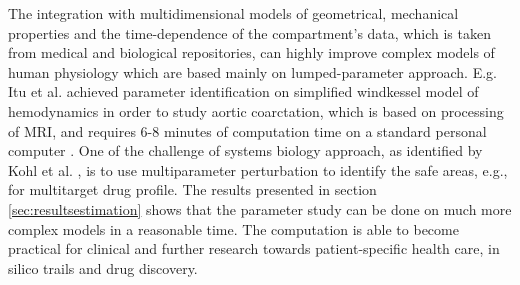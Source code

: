 \begin{itemize}
The integration with multidimensional models of geometrical, mechanical properties and the time-dependence of the compartment's data, which is taken from medical and biological repositories, can highly improve complex models of human physiology which are based mainly on lumped-parameter approach. E.g. Itu et al. achieved parameter identification on simplified windkessel model of hemodynamics in order to study aortic coarctation, which is based on processing of MRI, and requires 6-8 minutes of computation time on a standard personal computer \cite{Itu2013}. One of the challenge of systems biology approach, as identified by Kohl et al. \cite{Kohl2010}, is to use multiparameter perturbation to identify the safe areas, e.g., for multitarget drug profile. The results presented in section \ref{sec:resultsestimation} shows that the parameter study can be done on much more complex models in a reasonable time. The computation is able to become practical for clinical and further research towards patient-specific health care, in silico trails and drug discovery. 


\end{itemize}
